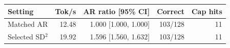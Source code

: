 \begin{tabular}{lrrrr}
\toprule
Setting & Tok/s & AR ratio [95\% CI] & Correct & Cap hits \\
\midrule
Matched AR & 12.48 & 1.000 [1.000, 1.000] & 103/128 & 11 \\
Selected SD$^2$ & 19.92 & 1.596 [1.560, 1.632] & 103/128 & 11 \\
\bottomrule
\end{tabular}

